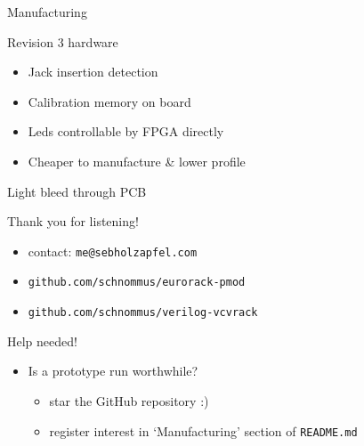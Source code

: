 \documentclass{beamer}
\begin{document}
\begin{frame}{Manufacturing}

    \begin{block}{Revision 3 hardware}
        \begin{itemize}
            \item Jack insertion detection
            \item Calibration memory on board
            \item Leds controllable by FPGA directly
            \item Cheaper to manufacture \& lower profile
        \end{itemize}
    \end{block}

\end{frame}

\begin{frame}{Light bleed through PCB}


\end{frame}

\begin{frame}{Thank you for listening!}

    \begin{itemize}
        \item contact: \texttt{me@sebholzapfel.com}
        \item \texttt{github.com/schnommus/eurorack-pmod}
        \item \texttt{github.com/schnommus/verilog-vcvrack}
    \end{itemize}

    \begin{block}{Help needed!}
        \begin{itemize}
            \item Is a prototype run worthwhile?
            \begin{itemize}
                \item star the GitHub repository :)
                \item register interest in `Manufacturing' section of \texttt{README.md}
            \end{itemize}
        \end{itemize}
    \end{block}

\end{frame}
\end{document}
